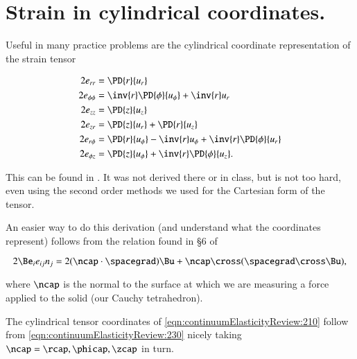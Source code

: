 % 
% 
% 
% 
% 
% 
% 
% 
% 
% 
% 
% 

\section{Strain in cylindrical coordinates.}

Useful in many practice problems are the cylindrical coordinate representation of the strain tensor 

\begin{align}\label{eqn:continuumElasticityReview:210}
2 e_{rr} &= \PD{r}{u_r}  \\
2 e_{\phi\phi} &= \inv{r} \PD{\phi}{u_\phi} +\inv{r} u_r  \\
2 e_{zz} &= \PD{z}{u_z}  \\
2 e_{zr} &= \PD{z}{u_r} + \PD{r}{u_z} \\
2 e_{r\phi} &= \PD{r}{u_\phi} - \inv{r} u_\phi + \inv{r} \PD{\phi}{u_r} \\
2 e_{\phi z} &= \PD{z}{u_\phi} +\inv{r} \PD{\phi}{u_z}.
\end{align}

This can be found in \cite{landau1960theory}.  It was not derived there or in class, but is not too hard, even using the second order methods we used for the Cartesian form of the tensor.

An easier way to do this derivation (and understand what the coordinates represent) follows from the relation found in \S 6 of \cite{acheson1990elementary}

\begin{equation}\label{eqn:continuumElasticityReview:230}
2 \Be_i e_{ij} n_j = 2 (\ncap \cdot \spacegrad) \Bu + \ncap \cross (\spacegrad \cross \Bu),
\end{equation}

where $\ncap$ is the normal to the surface at which we are measuring a force applied to the solid (our Cauchy tetrahedron).

The cylindrical tensor coordinates of \ref{eqn:continuumElasticityReview:210} follow from 
\ref{eqn:continuumElasticityReview:230} nicely taking $\ncap = \rcap, \phicap, \zcap$ in turn.

